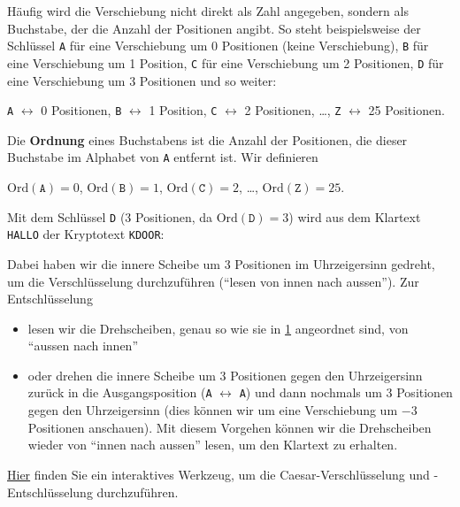 \begin{myremark}\label{myremark:buchstaben_als_zahlen}
	Häufig wird die Verschiebung nicht direkt als Zahl angegeben, sondern als Buchstabe, der die Anzahl der Positionen angibt. So steht beispielsweise der Schlüssel \texttt{A} für eine Verschiebung um 0 Positionen (keine Verschiebung), \texttt{B} für eine Verschiebung um 1 Position, \texttt{C} für eine Verschiebung um 2 Positionen, \texttt{D} für eine Verschiebung um 3 Positionen und so weiter:
	\begin{center}
		\texttt{A} $\leftrightarrow$ 0 Positionen, \texttt{B} $\leftrightarrow$ 1 Position, \texttt{C} $\leftrightarrow$ 2 Positionen, \dots , \texttt{Z} $\leftrightarrow$ 25 Positionen.
	\end{center}
\end{myremark}

\begin{mydefinition}\label{mydefinition:ordnung_buchstabe}
	Die \textbf{Ordnung} eines Buchstabens ist die Anzahl der Positionen, die dieser Buchstabe im Alphabet von \texttt{A} entfernt ist. Wir definieren
	\begin{center}
		$\text{Ord}(\texttt{A}) = 0$, $\text{Ord}(\texttt{B}) = 1$, $\text{Ord}(\texttt{C}) = 2$, \dots, $\text{Ord}(\texttt{Z}) = 25$.
	\end{center}
\end{mydefinition}

\begin{myexample}
	Mit dem Schlüssel \texttt{D} (3 Positionen, da $\text{Ord}(\texttt{D}) = 3$)  wird aus dem Klartext \texttt{HALLO} der Kryptotext \texttt{KDOOR}:
	\begin{figure}[H]
		\centering
		\caesar[3]
		\label{fig:caesar_3}
	\end{figure}
	Dabei haben wir die innere Scheibe um 3 Positionen im Uhrzeigersinn gedreht, um die Verschlüsselung durchzuführen (\enquote{lesen von innen nach aussen}). Zur Entschlüsselung
	\begin{itemize}
		\item lesen wir die Drehscheiben, genau so wie sie in \cref{fig:caesar_3} angeordnet sind, von \enquote{aussen nach innen}
		\item oder drehen die innere Scheibe um 3 Positionen gegen den Uhrzeigersinn zurück in die Ausgangsposition (\texttt{A} $\leftrightarrow$ \texttt{A}) und dann nochmals um 3 Positionen gegen den Uhrzeigersinn (dies können wir um eine Verschiebung um $-3$ Positionen anschauen).
		      Mit diesem Vorgehen können wir die Drehscheiben wieder von \enquote{innen nach aussen} lesen, um den Klartext zu erhalten.
	\end{itemize}
	\href{https://www.101computing.net/cipher-wheel.html}{Hier} finden Sie ein interaktives Werkzeug, um die Caesar-Verschlüsselung und -Entschlüsselung durchzuführen.
\end{myexample}

